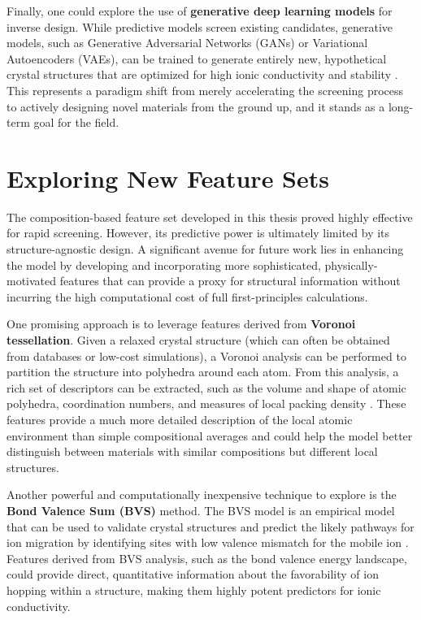 Finally, one could explore the use of \textbf{generative deep learning models} for inverse design. While predictive models screen existing candidates, generative models, such as Generative Adversarial Networks (GANs) or Variational Autoencoders (VAEs), can be trained to generate entirely new, hypothetical crystal structures that are optimized for high ionic conductivity and stability \cite{Kim2020}. This represents a paradigm shift from merely accelerating the screening process to actively designing novel materials from the ground up, and it stands as a long-term goal for the field.

\section{Exploring New Feature Sets}

The composition-based feature set developed in this thesis proved highly effective for rapid screening. However, its predictive power is ultimately limited by its structure-agnostic design. A significant avenue for future work lies in enhancing the model by developing and incorporating more sophisticated, physically-motivated features that can provide a proxy for structural information without incurring the high computational cost of full first-principles calculations.

One promising approach is to leverage features derived from \textbf{Voronoi tessellation}. Given a relaxed crystal structure (which can often be obtained from databases or low-cost simulations), a Voronoi analysis can be performed to partition the structure into polyhedra around each atom. From this analysis, a rich set of descriptors can be extracted, such as the volume and shape of atomic polyhedra, coordination numbers, and measures of local packing density \cite{Ward2017}. These features provide a much more detailed description of the local atomic environment than simple compositional averages and could help the model better distinguish between materials with similar compositions but different local structures.

Another powerful and computationally inexpensive technique to explore is the \textbf{Bond Valence Sum (BVS)} method. The BVS model is an empirical model that can be used to validate crystal structures and predict the likely pathways for ion migration by identifying sites with low valence mismatch for the mobile ion \cite{Adams2001}. Features derived from BVS analysis, such as the bond valence energy landscape, could provide direct, quantitative information about the favorability of ion hopping within a structure, making them highly potent predictors for ionic conductivity.

